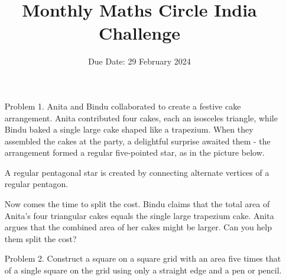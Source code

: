 \documentclass[a4paper,12pt]{article}
\title{Monthly Maths Circle India Challenge}
\date{Due Date: 29 February 2024}
\begin{document}
\maketitle
\thispagestyle{empty}
\begin{enumerate}
    \item[Problem 1.] Anita and Bindu collaborated to create a festive cake arrangement. Anita contributed four cakes, each an isosceles triangle, while Bindu baked a single large cake shaped like a trapezium. When they assembled the cakes at the party, a delightful surprise awaited them - the arrangement formed a regular five-pointed star, as in the picture below.
    \begin{figure}[h]
        \centering
                        
    \end{figure}

    A regular pentagonal star is created by connecting alternate vertices of a regular pentagon.

    Now comes the time to split the cost. Bindu claims that the total area of Anita's four triangular cakes equals the single large trapezium cake. Anita argues that the combined area of her cakes might be larger. Can you help them split the cost?

    
    \item[Problem 2.] Construct a square on a square grid with an area five times that of a single square on the grid using only a straight edge and a pen or pencil.
    \begin{figure}[h]
        \centering
        
    \end{figure}
\end{enumerate}
\end{document}
